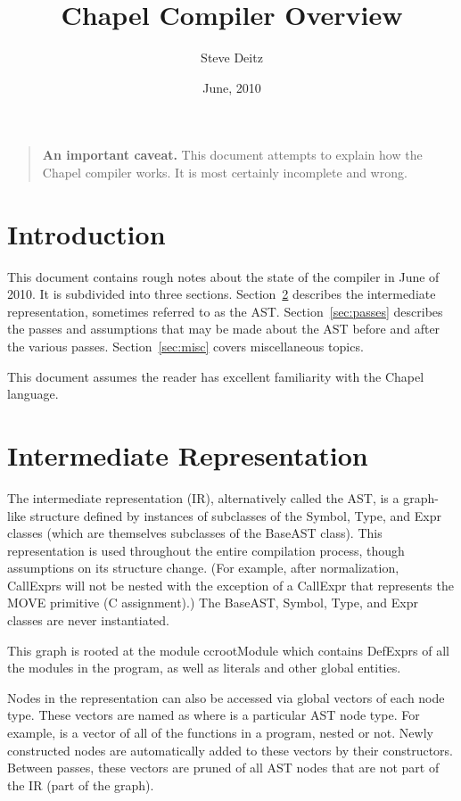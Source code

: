 \documentclass[10pt]{article}
\title{Chapel Compiler Overview}
\author{Steve Deitz}
\date{June, 2010}
\begin{document}
\maketitle

\begin{quote}
\footnotesize
{\bf An important caveat.}  This document attempts to explain how the
Chapel compiler works.  It is most certainly incomplete and wrong.
\end{quote}

{
  \footnotesize
  \tableofcontents
}

\section{Introduction}

This document contains rough notes about the state of the compiler in
June of 2010.  It is subdivided into three sections.
Section~\ref{sec:ast} describes the intermediate representation,
sometimes referred to as the AST.  Section~\ref{sec:passes} describes
the passes and assumptions that may be made about the AST before and
after the various passes.  Section~\ref{sec:misc} covers miscellaneous
topics.

This document assumes the reader has excellent familiarity with the
Chapel language.

\section{Intermediate Representation}
\label{sec:ast}

The intermediate representation (IR), alternatively called the AST, is
a graph-like structure defined by instances of subclasses of the
Symbol, Type, and Expr classes (which are themselves subclasses of the
BaseAST class).  This representation is used throughout the entire
compilation process, though assumptions on its structure change.  (For
example, after normalization, CallExprs will not be nested with the
exception of a CallExpr that represents the MOVE primitive (C
assignment).)  The BaseAST, Symbol, Type, and Expr classes are never
instantiated.

This graph is rooted at the module cc{rootModule} which contains DefExprs
of all the modules in the program, as well as literals and other
global entities.

Nodes in the representation can also be accessed via global vectors of
each node type.  These vectors are named as  where 
is a particular AST node type.  For example,  is a
vector of all of the functions in a program, nested or not.  Newly
constructed nodes are automatically added to these vectors by their
constructors.  Between passes, these vectors are pruned of all AST
nodes that are not part of the IR (part of the graph).
\end{document}
